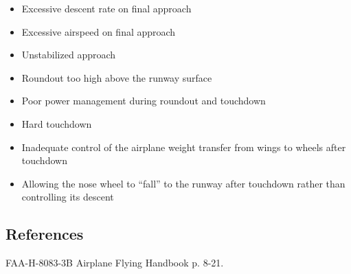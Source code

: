 \begin{itemize}
  \item Excessive descent rate on final approach
  \item Excessive airspeed on final approach
  \item Unstabilized approach
  \item Roundout too high above the runway surface
  \item Poor power management during roundout and touchdown
  \item Hard touchdown
  \item Inadequate control of the airplane weight transfer from wings to wheels
    after touchdown
  \item Allowing the nose wheel to ``fall'' to the runway after touchdown
    rather than controlling its descent
\end{itemize}

\subsection{References}

FAA-H-8083-3B Airplane Flying Handbook p. 8-21.

